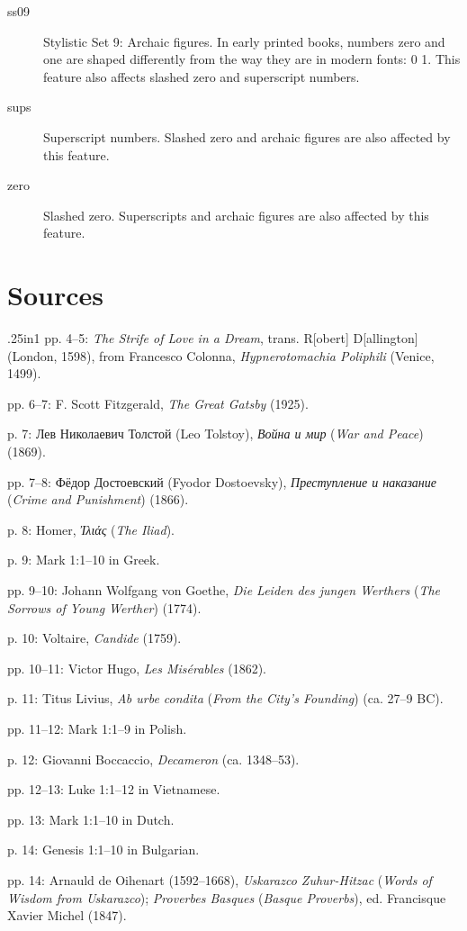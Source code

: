 \documentclass[12pt]{book}
\begin{document}
\begin{description}
\item[ss09] Stylistic Set 9: Archaic figures. In early printed books,
  numbers zero and one are shaped differently from the way they are in
  modern fonts: {0 1}. This feature
  also affects slashed zero and superscript numbers.

\item[sups] Superscript numbers. Slashed zero and archaic figures are also affected by this feature.

\item[zero] Slashed zero. Superscripts and archaic figures are also affected by this feature.

\end{description}

\section*{Sources}
\begin{hangparas}{.25in}{1}
pp. 4–5: \textit{The Strife of Love in a Dream}, trans. R[obert]
D[allington] (London, 1598), from Francesco Colonna,
\textit{Hypnerotomachia Poliphili} (Venice, 1499).

pp. 6–7: F. Scott Fitzgerald, \textit{The Great Gatsby} (1925).

p. 7: Лев Николаевич Толстой (Leo Tolstoy), \textit{Война и мир} (\textit{War and Peace}) (1869).

pp. 7–8:  Фёдор Достоевский (Fyodor Dostoevsky), \textit{Преступление и наказание} (\textit{Crime and Punishment}) (1866).

p. 8: Homer, \textit{Ἰλιάς} (\textit{The Iliad}).

p. 9: Mark 1:1–10 in Greek.

pp. 9–10: Johann Wolfgang von Goethe, \textit{Die Leiden des jungen Werthers}
(\textit{The Sorrows of Young Werther}) (1774).

p. 10: Voltaire, \textit{Candide} (1759).

pp. 10–11: Victor Hugo, \textit{Les Misérables} (1862).

p. 11: Titus Livius, \textit{Ab urbe condita} (\textit{From the City's
  Founding}) (ca. 27–9 BC).

pp. 11–12: Mark 1:1–9 in Polish.

p. 12: Giovanni Boccaccio, \textit{Decameron} (ca. 1348–53).

pp. 12–13: Luke 1:1–12 in Vietnamese.

pp. 13: Mark 1:1–10 in Dutch.

p. 14: Genesis 1:1–10 in Bulgarian.

pp. 14: Arnauld de Oihenart (1592–1668), \textit{Uskarazco Zuhur-Hitzac}
(\textit{Words of Wisdom from Uskarazco}); \textit{Proverbes Basques}
(\textit{Basque Proverbs}), ed. Francisque Xavier Michel (1847).
\end{hangparas}
\end{document}
